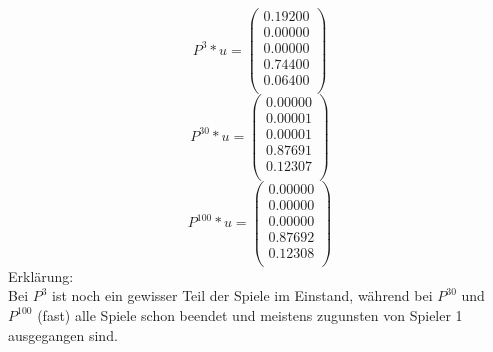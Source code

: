 \documentclass{article}
\begin{document}
\[
P^3 * u=
  \begin{pmatrix}
    0.19200 \\
    0.00000 \\
    0.00000 \\
    0.74400 \\
    0.06400 \\
    
  \end{pmatrix}
\]
\[
P^{30} * u=
  \begin{pmatrix}
    0.00000 \\
    0.00001 \\
    0.00001 \\
    0.87691 \\
    0.12307 \\
    
  \end{pmatrix}
\]
\[
P^{100} * u=
  \begin{pmatrix}
    0.00000 \\
    0.00000 \\
    0.00000 \\
    0.87692 \\
    0.12308 \\
    
  \end{pmatrix}
\]
Erklärung: \\
Bei $P^3$ ist noch ein gewisser Teil der Spiele im Einstand, während bei $P^{30}$ und $P^{100}$ (fast) alle Spiele schon beendet und meistens zugunsten von Spieler 1 ausgegangen sind.

\subsubsection{}
\end{document}
